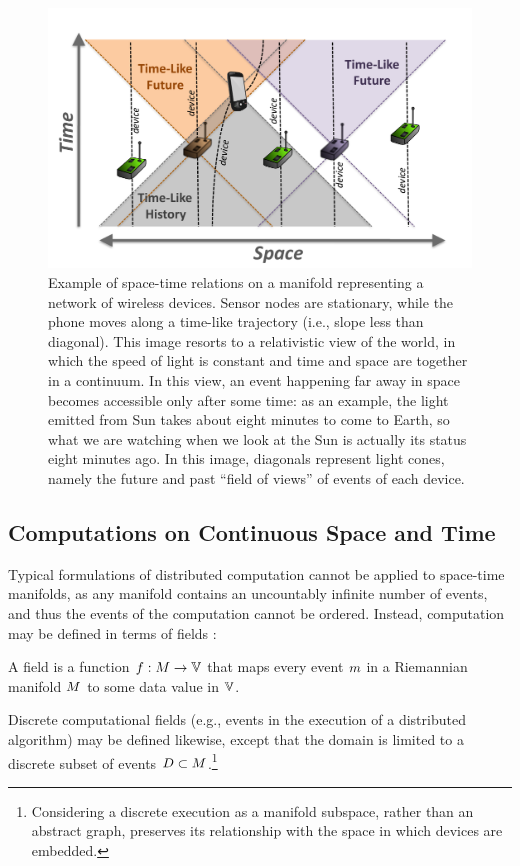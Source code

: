 \documentclass[12pt,a4paper,twoside,openright]{book}
\begin{document}
\begin{figure}
\centering
\includegraphics[width=\columnwidth]{img/spacetime}
\caption[Example of space-time relations on a manifold]{Example of space-time relations on a manifold representing a network of wireless devices.
%
Sensor nodes are stationary, while the phone moves along a time-like trajectory (i.e., slope less than diagonal).
%
This image resorts to a relativistic view of the world, in which the speed of light is constant and time and space are together in a continuum.
%
In this view, an event happening far away in space becomes accessible only after some time: as an example, the light emitted from Sun takes about eight minutes to come to Earth, so what we are watching when we look at the Sun is actually its status eight minutes ago.
%
In this image, diagonals represent light cones, namely the future and past ``field of views'' of events of each device.
}
\label{f:spacetime}
\end{figure}

\subsection{Computations on Continuous Space and Time}

Typical formulations of distributed computation \cite{Lynch:1996:DA:525656} cannot be applied to space-time manifolds, as any manifold contains an uncountably infinite number of events, and thus the events of the computation cannot be ordered.
%
Instead, computation may be defined in terms of fields \cite{bealBasisSCW10,BVD-SCW14,BealUsbeck12}:
\begin{thrdefn}
  A field is a function $\field: \manifold \rightarrow \spaceof{\datavalue}$ that maps every event $m$ in a Riemannian manifold $M$ to some data value in $\spaceof{\datavalue}$.
\end{thrdefn}
\noindent
Discrete computational fields (e.g., events in the execution of a distributed algorithm) may be defined likewise, except that the domain is limited to a discrete subset of events $D \subset M$.\footnote{Considering a discrete execution as a manifold subspace, rather than an abstract graph, preserves its relationship with the space in which devices are embedded.}
\end{document}
